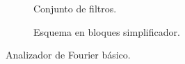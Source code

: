     \begin{figure}[H]
        \centering
        \begin{subfigure}[H]{0.48\textwidth}
          \caption{Conjunto de filtros.}
          \label{fig:EsqInicialFourier}
        \end{subfigure}
        \hfill 
        \begin{subfigure}[H]{0.45\textwidth}
          \caption{Esquema en bloques simplificador.}
          \label{fig:EsqAnalizadorDeFourierBasico}
        \end{subfigure}
        \caption{Analizador de Fourier básico.}
        \label{fig:AnalizadorDeFourier}
      \end{figure}
       
